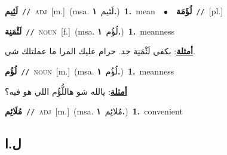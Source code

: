 \documentclass[10pt,a4paper,twoside]{article} %
\begin{document}
\begin{multicols}{2}
{\setlength\topsep{0pt}\textbf{\foreignlanguage{arabic}{لَئِيم}}\ {\color{gray}\texttt{//}\color{black}}\ \textsc{adj}\ [m.]\ \color{gray}(msa. \foreignlanguage{arabic}{لَئيم}~\foreignlanguage{arabic}{\textbf{١.}})\color{black}\ \textbf{1.}~mean\ \ $\bullet$\ \ \setlength\topsep{0pt}\textbf{\foreignlanguage{arabic}{لُؤَمَة}}\ {\color{gray}\texttt{//}\color{black}}\ [pl.]\ 

{\setlength\topsep{0pt}\textbf{\foreignlanguage{arabic}{لَئْمَنِة}}\ {\color{gray}\texttt{//}\color{black}}\ \textsc{noun}\ [f.]\ \color{gray}(msa. \foreignlanguage{arabic}{لُؤُم}~\foreignlanguage{arabic}{\textbf{١.}})\color{black}\ \textbf{1.}~meanness\  \begin{flushright}\color{gray}\foreignlanguage{arabic}{\textbf{\underline{\foreignlanguage{arabic}{أمثلة}}}: بكفي لَئْمَنِة جد. حرام عليك المرا ما عملتلك شي.}\end{flushright}\color{black}} \vspace{2mm}

{\setlength\topsep{0pt}\textbf{\foreignlanguage{arabic}{لُؤُم}}\ {\color{gray}\texttt{//}\color{black}}\ \textsc{noun}\ [m.]\ \color{gray}(msa. \foreignlanguage{arabic}{لُؤُم}~\foreignlanguage{arabic}{\textbf{١.}})\color{black}\ \textbf{1.}~meanness\  \begin{flushright}\color{gray}\foreignlanguage{arabic}{\textbf{\underline{\foreignlanguage{arabic}{أمثلة}}}: يالله شو هاللُّؤُم اللي هو فيه؟}\end{flushright}\color{black}} \vspace{2mm}

{\setlength\topsep{0pt}\textbf{\foreignlanguage{arabic}{مُلَائِم}}\ {\color{gray}\texttt{//}\color{black}}\ \textsc{adj}\ [m.]\ \color{gray}(msa. \foreignlanguage{arabic}{مُلائِم}~\foreignlanguage{arabic}{\textbf{١.}})\color{black}\ \textbf{1.}~convenient\ 

\vspace{-3mm}
\subsection*{\color{blue}\foreignlanguage{arabic}{ل.ا}\color{blue}{ (ntws)}} 

}}
\end{multicols}
\end{document}
